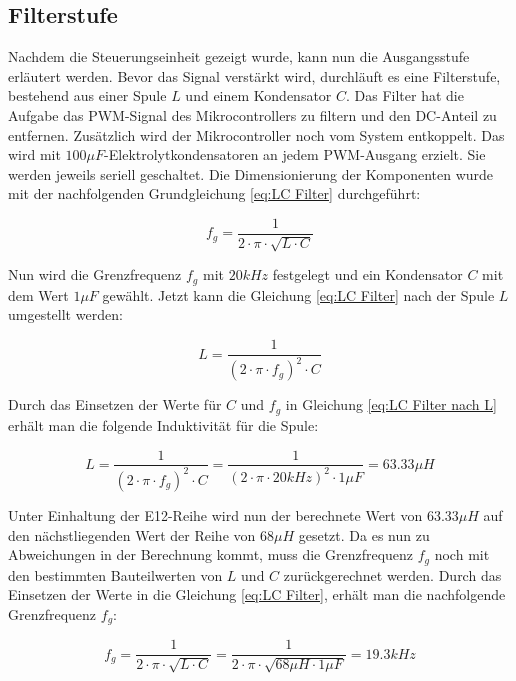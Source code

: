 \subsection{Filterstufe}\label{sec:filterstufe}
Nachdem die Steuerungseinheit gezeigt wurde, kann nun die Ausgangsstufe erläutert werden. Bevor das Signal verstärkt wird, durchläuft es eine Filterstufe, bestehend aus einer Spule $L$ und einem Kondensator $C$. Das Filter hat die Aufgabe das PWM-Signal des Mikrocontrollers zu filtern und den DC-Anteil zu entfernen. Zusätzlich wird der Mikrocontroller noch vom System entkoppelt. Das wird mit $100\mu F$-Elektrolytkondensatoren an jedem PWM-Ausgang erzielt. Sie werden jeweils seriell geschaltet. Die Dimensionierung der Komponenten wurde mit der nachfolgenden Grundgleichung \ref{eq:LC Filter} durchgeführt:

\begin{equation}
f_g = \frac{1}{2\cdot \pi \cdot \sqrt{L\cdot C}}
\label{eq:LC Filter}
\end{equation}

Nun wird die Grenzfrequenz $f_g$ mit $20 kHz$ festgelegt und ein Kondensator $C$ mit dem Wert $1\mu F$ gewählt. Jetzt kann die Gleichung \ref{eq:LC Filter} nach der Spule $L$ umgestellt werden:

\begin{equation}
L = \frac{1}{(2\cdot \pi \cdot f_g)^2\cdot C }
\label{eq:LC Filter nach L}
\end{equation}

Durch das Einsetzen der Werte für $C$ und $f_g$ in Gleichung \ref{eq:LC Filter nach L} erhält man die folgende Induktivität für die Spule:

\begin{equation}
L = \frac{1}{(2\cdot \pi \cdot f_g)^2\cdot C } = \frac{1}{(2\cdot \pi \cdot 20 kHz)^2\cdot 1 \mu F } = 63.33\mu H
\label{eq:LC Filter nach L 1}
\end{equation}

Unter Einhaltung der {\glqq E12-Reihe\grqq} wird nun der berechnete Wert von $63.33\mu H$ auf den nächstliegenden Wert der Reihe von $68\mu H$ gesetzt. Da es nun zu Abweichungen in der Berechnung kommt, muss die Grenzfrequenz $f_g$ noch mit den bestimmten Bauteilwerten von $L$ und $C$ zurückgerechnet werden. Durch das Einsetzen der Werte in die Gleichung \ref{eq:LC Filter}, erhält man die nachfolgende Grenzfrequenz $f_g$:

\begin{equation}
f_g = \frac{1}{2\cdot \pi \cdot \sqrt{L\cdot C}} = \frac{1}{2\cdot \pi \cdot \sqrt{68\mu H \cdot 1 \mu F}} = 19.3 kHz
\label{eq:LC Filter 1}
\end{equation}

